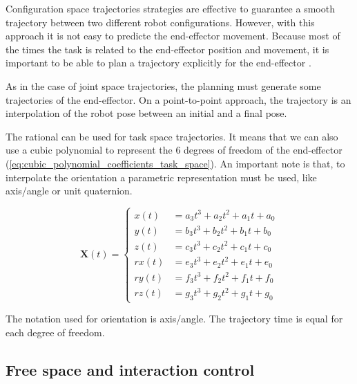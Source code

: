 Configuration space trajectories strategies are effective to guarantee a smooth trajectory between two different robot configurations. However, with this approach it is not easy to predicte the end-effector movement. Because most of the times the task is related to the end-effector position and movement, it is important to be able to plan a trajectory explicitly for the end-effector \cite{Siciliano2009_robotics_modelling_planning_control}.

As in the case of joint space trajectories, the planning must generate some trajectories of the end-effector. On a point-to-point approach, the trajectory is an interpolation of the robot pose between an initial and a final pose.

The rational can be used for task space trajectories. It means that we can also use a cubic polynomial to represent the 6 degrees of freedom of the end-effector (\ref{eq:cubic_polynomial_coefficients_task_space}). An important note is that, to interpolate the orientation a parametric representation must be used, like axis/angle or unit quaternion.

\begin{equation}
    \label{eq:cubic_polynomial_coefficients_task_space}
    \boldsymbol{X}(t) = \left\{
    \begin{aligned}
        x(t) &= a_3 t^3 + a_2 t^2 + a_1 t + a_0\\
        y(t) &= b_3 t^3 + b_2 t^2 + b_1 t + b_0\\
        z(t) &= c_3 t^3 + c_2 t^2 + c_1 t + c_0\\
        rx(t) &= e_3 t^3 + e_2 t^2 + e_1 t + e_0\\
        ry(t) &= f_3 t^3 + f_2 t^2 + f_1 t + f_0\\
        rz(t) &= g_3 t^3 + g_2 t^2 + g_1 t + g_0
    \end{aligned}
    \right.
\end{equation}

The notation used for orientation is axis/angle. The trajectory time is equal for each degree of freedom.



\subsection{Free space and interaction control}
\label{subsec:free_space_interaction_control}

